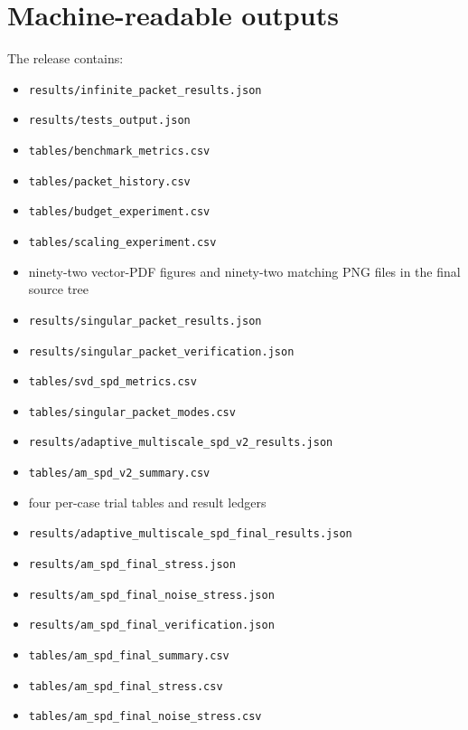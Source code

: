 \documentclass[11pt]{article}
\theoremstyle{definition}
\theoremstyle{remark}
\begin{document}
\section{Machine-readable outputs}
The release contains:
\begin{itemize}
\item \texttt{results/infinite\_packet\_results.json}
\item \texttt{results/tests\_output.json}
\item \texttt{tables/benchmark\_metrics.csv}
\item \texttt{tables/packet\_history.csv}
\item \texttt{tables/budget\_experiment.csv}
\item \texttt{tables/scaling\_experiment.csv}
\item ninety-two vector-PDF figures and ninety-two matching PNG files in the final source tree
\item \texttt{results/singular\_packet\_results.json}
\item \texttt{results/singular\_packet\_verification.json}
\item \texttt{tables/svd\_spd\_metrics.csv}
\item \texttt{tables/singular\_packet\_modes.csv}
\item \texttt{results/adaptive\_multiscale\_spd\_v2\_results.json}
\item \texttt{tables/am\_spd\_v2\_summary.csv}
\item four per-case trial tables and result ledgers
\item \texttt{results/adaptive\_multiscale\_spd\_final\_results.json}
\item \texttt{results/am\_spd\_final\_stress.json}
\item \texttt{results/am\_spd\_final\_noise\_stress.json}
\item \texttt{results/am\_spd\_final\_verification.json}
\item \texttt{tables/am\_spd\_final\_summary.csv}
\item \texttt{tables/am\_spd\_final\_stress.csv}
\item \texttt{tables/am\_spd\_final\_noise\_stress.csv}
\end{itemize}
\end{document}

